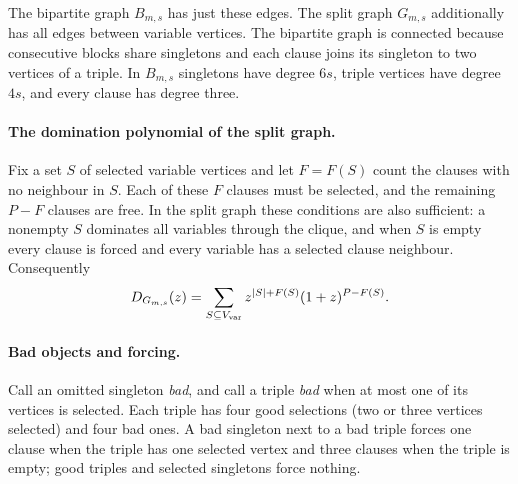 \documentclass[11pt,a4paper]{article}
\theoremstyle{definition}
\theoremstyle{remark}
\begin{document}
The bipartite graph $B_{m,s}$ has just these edges. The split graph $G_{m,s}$ additionally has all edges between variable vertices. The bipartite graph is connected because consecutive blocks share singletons and each clause joins its singleton to two vertices of a triple. In $B_{m,s}$ singletons have degree $6s$, triple vertices have degree $4s$, and every clause has degree three.

\paragraph{The domination polynomial of the split graph.}
Fix a set $S$ of selected variable vertices and let $F=F(S)$ count the clauses with no neighbour in $S$. Each of these $F$ clauses must be selected, and the remaining $P-F$ clauses are free. In the split graph these conditions are also sufficient: a nonempty $S$ dominates all variables through the clique, and when $S$ is empty every clause is forced and every variable has a selected clause neighbour. Consequently
\begin{equation}\label{eq:exactpoly}
D_{G_{m,s}}(z)=
\sum_{S\subseteq V_{\rm var}}z^{|S|+F(S)}(1+z)^{P-F(S)} .
\end{equation}

\paragraph{Bad objects and forcing.} Call an omitted singleton \emph{bad}, and call a triple \emph{bad} when at most one of its vertices is selected. Each triple has four good selections (two or three vertices selected) and four bad ones. A bad singleton next to a bad triple forces one clause when the triple has one selected vertex and three clauses when the triple is empty; good triples and selected singletons force nothing.
\end{document}
